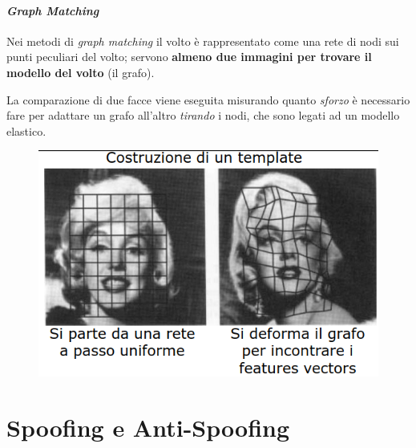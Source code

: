 \documentclass{report}
\begin{document}
\subsubsection{\textit{Graph Matching}}
Nei metodi di \textit{graph matching} il volto è rappresentato 
come una rete di nodi sui punti peculiari del volto; servono 
\textbf{almeno due immagini per trovare il modello del volto} (il grafo).

\noindent La comparazione di due facce viene eseguita misurando 
quanto \textit{sforzo} è necessario fare per adattare un grafo all'altro
\textit{tirando} i nodi, che sono legati ad un modello elastico.

\begin{figure}[ht]
    \centering
    \includegraphics[width=0.8\linewidth]{images/graph.png}
\end{figure}

\chapter{Spoofing e Anti-Spoofing}
\end{document}
